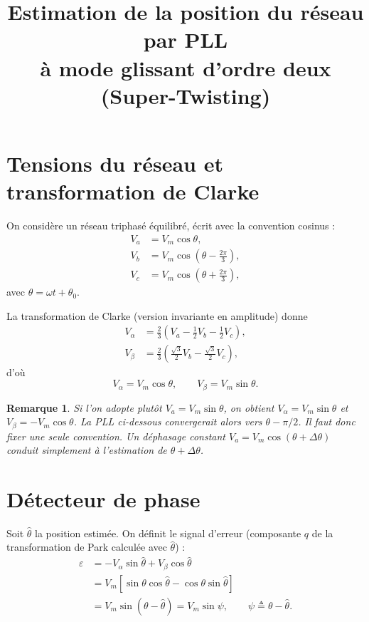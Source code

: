 \documentclass[11pt,a4paper]{article}
\title{Estimation de la position du réseau par PLL\\ à mode glissant d'ordre deux (Super-Twisting)}
\author{}
\date{}
\newtheorem{remarque}{Remarque}
\newcommand{\hth}{\hat{\theta}}
\begin{document}
\maketitle

\section{Tensions du réseau et transformation de Clarke}

On considère un réseau triphasé équilibré, écrit avec la convention cosinus :
\begin{align}
V_a &= V_m \cos\theta, \\
V_b &= V_m \cos\!\left(\theta - \tfrac{2\pi}{3}\right), \\
V_c &= V_m \cos\!\left(\theta + \tfrac{2\pi}{3}\right),
\end{align}
avec $\theta = \omega t + \theta_0$.

La transformation de Clarke (version invariante en amplitude) donne
\begin{align}
V_\alpha &= \frac{2}{3}\left(V_a - \frac{1}{2}V_b - \frac{1}{2}V_c\right), \\
V_\beta  &= \frac{2}{3}\left(\frac{\sqrt{3}}{2}V_b - \frac{\sqrt{3}}{2}V_c\right),
\end{align}
d'où
\begin{equation}
V_\alpha = V_m\cos\theta, \qquad V_\beta = V_m\sin\theta .
\end{equation}

\begin{remarque}
Si l'on adopte plutôt $V_a = V_m\sin\theta$, on obtient $V_\alpha = V_m\sin\theta$ et
$V_\beta = -V_m\cos\theta$. La PLL ci-dessous convergerait alors vers $\theta-\pi/2$.
Il faut donc fixer une seule convention. Un déphasage constant
$V_a = V_m\cos(\theta+\Delta\theta)$ conduit simplement à l'estimation de $\theta+\Delta\theta$.
\end{remarque}

\section{Détecteur de phase}

Soit $\hth$ la position estimée. On définit le signal d'erreur
(composante $q$ de la transformation de Park calculée avec $\hth$) :
\begin{align}
\varepsilon &= -V_\alpha\sin\hth + V_\beta\cos\hth \\
&= V_m\left[\sin\theta\cos\hth - \cos\theta\sin\hth\right] \\
&= V_m\sin(\theta-\hth) = V_m \sin\psi, \qquad \psi \triangleq \theta-\hth .
\end{align}
\end{document}
